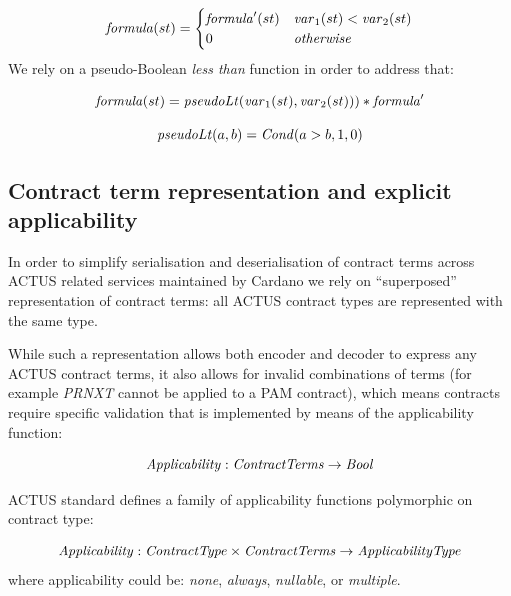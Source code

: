 \documentclass[runningheads]{llncs}
\newcommand{\ident}[1]{\mbox{\emph{#1}}}
\begin{document}
\begin{equation*}
\ident{formula}(st)=\begin{cases}
\ident{formula}^\prime(st) & \ident{var}_1(st)<\ident{var}_2(st)\\
0 & \ident{otherwise}
\end{cases}
\end{equation*}
We rely on a pseudo-Boolean \emph{less than} function in order to address
that:

\noindent 
\begin{equation*}
\ident{formula}(st)=\ident{pseudoLt}(\ident{var}_1(st),\ident{var}_2(st)))*\ident{formula}^\prime
\end{equation*}

\noindent 
\begin{equation*}
\ident{pseudoLt}(a,b)=\ident{Cond}(a>b,1,0)
\end{equation*}


\subsection{Contract term representation and explicit applicability}

In order to simplify serialisation and deserialisation of contract terms
across ACTUS related services maintained by Cardano we rely on ``superposed''
representation of contract terms: all ACTUS contract types are represented
with the same type. 

While such a representation allows both encoder
and decoder to express any ACTUS contract terms, it also allows for
invalid combinations of terms (for example \emph{PRNXT} cannot be applied
to a PAM contract), which means contracts require specific validation
that is implemented by means of the applicability function:

\noindent 
\begin{equation*}
\ident{Applicability}:\ident{ContractTerms}\rightarrow \ident{Bool}
\end{equation*}

ACTUS standard defines a family of applicability functions polymorphic on contract
type:

\smallskip
\noindent 
\begin{equation*}
\ident{Applicability} : \ident{ContractType} \times \ident{ContractTerms} \rightarrow \ident{ApplicabilityType}
\end{equation*}
\noindent
where applicability could be: \emph{none}, \emph{always}, \emph{nullable}, or \emph{multiple}.
\end{document}
